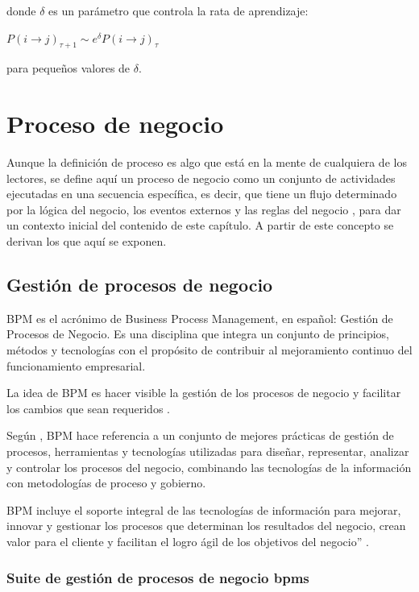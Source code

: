 donde $\delta$ es un parámetro que controla la rata de aprendizaje:

$P(i \to j)_{\tau+1} \sim e^{\delta} P(i \to j)_{\tau}$ 

para pequeños valores de $\delta$.

\section{Proceso de negocio}

Aunque la definición de proceso es algo que está en la mente de cualquiera de los lectores, se define aquí un proceso de negocio como un conjunto de actividades ejecutadas en una secuencia específica, es decir, que tiene un flujo determinado por la lógica del negocio, los eventos externos y las reglas del negocio \citep{hitpass2017bpm}, para dar un contexto inicial del contenido de este capítulo. A partir de este concepto se derivan los que aquí se exponen.

\subsection{Gestión de procesos de negocio}

BPM es el acrónimo de Business Process Management, en español: Gestión de Procesos de Negocio. Es una disciplina que integra un conjunto de principios, métodos y tecnologías con el propósito de contribuir al mejoramiento continuo del funcionamiento empresarial.

La idea de BPM es hacer visible la gestión de los procesos de negocio y facilitar los cambios que sean requeridos \citep{smith2003business}.

Según \citet{garimella2008introduccion}, BPM hace referencia a un conjunto de mejores prácticas de gestión de procesos, herramientas y tecnologías utilizadas para diseñar, representar, analizar y controlar los procesos del negocio, combinando las tecnologías de la información con metodologías de proceso y gobierno.

BPM incluye el soporte integral de las tecnologías de información para mejorar, innovar y gestionar los procesos que determinan los resultados del negocio, crean valor para el cliente y facilitan el logro ágil de los objetivos del negocio” \citep{abpmp2013v3}.

\subsubsection{Suite de gestión de procesos de negocio bpms}

